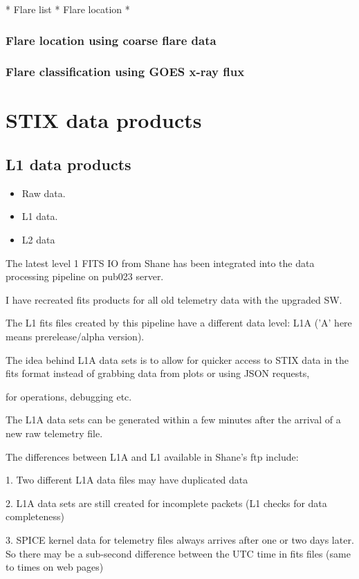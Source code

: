 \documentclass{aa}
\begin{document}
* Flare list
* Flare location
*

\subsubsection{Flare location using coarse flare data}
\subsubsection{Flare classification using GOES x-ray flux}

\section{STIX data products}

\subsection{L1 data products}
\begin{itemize}
    \item Raw data.
    \item L1 data.
    \item L2 data
    
\end{itemize}

The latest level 1 FITS IO from Shane has been integrated into the data processing pipeline on pub023 server.

I have recreated fits products for all old telemetry data with the upgraded SW.

The L1 fits files  created by this pipeline have a different data level:  L1A ('A' here means  prerelease/alpha version).

The idea behind L1A data sets is to allow for quicker access to STIX data in the fits format instead of grabbing  data from plots or using JSON requests,

for operations,  debugging  etc.

The L1A data sets can be generated within a few minutes after the arrival of a new raw telemetry file.

The differences between L1A and L1 available in Shane's ftp include:

1.  Two different L1A data files may have duplicated data

2.  L1A data sets are still created for incomplete packets  (L1 checks for data completeness)

3.  SPICE kernel data for telemetry files always arrives  after one or two days later.
    So  there may be a sub-second difference between the UTC time in fits files (same to times on web pages)
\end{document}
